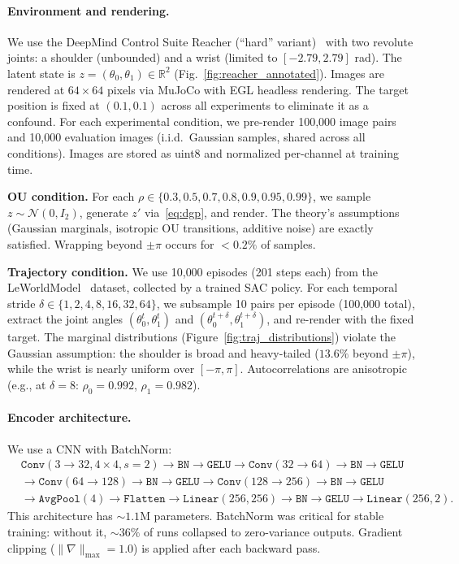 \paragraph{Environment and rendering.}
We use the DeepMind Control Suite Reacher (``hard'' variant)~\citep{tassa2018dmcontrol} with two revolute joints: a shoulder (unbounded) and a wrist (limited to $[-2.79, 2.79]$ rad).
The latent state is $z = (\theta_0, \theta_1) \in \mathbb{R}^2$ (Fig.~\ref{fig:reacher_annotated}).
Images are rendered at $64 \times 64$ pixels via MuJoCo with EGL headless rendering.
The target position is fixed at $(0.1, 0.1)$ across all experiments to eliminate it as a confound.
For each experimental condition, we pre-render 100{,}000 image pairs and 10{,}000 evaluation images (i.i.d.\ Gaussian samples, shared across all conditions).
Images are stored as uint8 and normalized per-channel at training time.

\textbf{OU condition.}
For each $\rho \in \{0.3, 0.5, 0.7, 0.8, 0.9, 0.95, 0.99\}$, we sample $z \sim \mathcal{N}(0, I_2)$, generate $z'$ via~\eqref{eq:dgp}, and render.
The theory's assumptions (Gaussian marginals, isotropic OU transitions, additive noise) are exactly satisfied.
Wrapping beyond $\pm\pi$ occurs for $<0.2\%$ of samples.

\textbf{Trajectory condition.}
We use 10{,}000 episodes (201 steps each) from the LeWorldModel~\citep{maes2026leworldmodel} dataset, collected by a trained SAC policy.
For each temporal stride $\delta \in \{1, 2, 4, 8, 16, 32, 64\}$, we subsample 10 pairs per episode (100{,}000 total), extract the joint angles $(\theta_0^t, \theta_1^t)$ and $(\theta_0^{t+\delta}, \theta_1^{t+\delta})$, and re-render with the fixed target.
The marginal distributions (Figure~\ref{fig:traj_distributions}) violate the Gaussian assumption: the shoulder is broad and heavy-tailed ($13.6\%$ beyond $\pm\pi$), while the wrist is nearly uniform over $[-\pi, \pi]$.
Autocorrelations are anisotropic (e.g., at $\delta=8$: $\rho_0 = 0.992$, $\rho_1 = 0.982$).

\paragraph{Encoder architecture.}
We use a CNN with BatchNorm:
\begin{align*}
    &\texttt{Conv}(3 \to 32, 4\times4, s{=}2) \to \texttt{BN} \to \texttt{GELU} \to
    \texttt{Conv}(32 \to 64) \to \texttt{BN} \to \texttt{GELU} \\
    &\to \texttt{Conv}(64 \to 128) \to \texttt{BN} \to \texttt{GELU} \to
    \texttt{Conv}(128 \to 256) \to \texttt{BN} \to \texttt{GELU} \\
    &\to \texttt{AvgPool}(4) \to \texttt{Flatten} \to \texttt{Linear}(256, 256) \to \texttt{BN} \to \texttt{GELU} \to \texttt{Linear}(256, 2).
\end{align*}
This architecture has ${\sim}1.1$M parameters.
BatchNorm was critical for stable training: without it, ${\sim}36\%$ of runs collapsed to zero-variance outputs.
Gradient clipping ($\|\nabla\|_{\max} = 1.0$) is applied after each backward pass.

